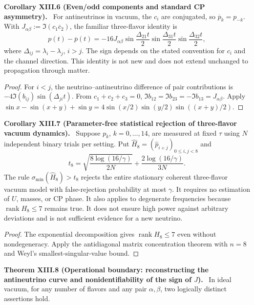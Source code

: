 \documentclass[11pt,a4paper,oneside]{book}
\DeclareMathOperator{\rank}{rank}\DeclareMathOperator{\Tr}{Tr}
\newcommand{\statement}[3]{\par\medskip\noindent\textbf{#1 #2 (#3).}\ }
\begin{document}
\statement{Corollary}{XIII.6}{Even/odd components and standard CP asymmetry} For antineutrinos in vacuum, the $c_i$ are conjugated, so $\overline p_k=p_{-k}$. With $J_{\alpha\beta}:=\Im(c_1\overline c_2)$, the familiar three-flavor identity is
\begin{equation}p(t)-\overline p(t)=-16J_{\alpha\beta}\sin\frac{\Delta_{21}t}{2}\sin\frac{\Delta_{31}t}{2}\sin\frac{\Delta_{32}t}{2},\tag{63}\end{equation}
where $\Delta_{ij}=\lambda_i-\lambda_j$, $i>j$. The sign depends on the stated convention for $c_i$ and the channel direction. This identity is not new and does not extend unchanged to propagation through matter.
\begin{proof}For $i<j$, the neutrino--antineutrino difference of pair contributions is $-4\Im(b_{ij})\sin(\Delta_{ji}t)$. From $c_1+c_2+c_3=0$, $\Im b_{12}=\Im b_{23}=-\Im b_{13}=J_{\alpha\beta}$. Apply $\sin x-\sin(x+y)+\sin y=4\sin(x/2)\sin(y/2)\sin((x+y)/2)$.\end{proof}
\statement{Corollary}{XIII.7}{Parameter-free statistical rejection of three-flavor vacuum dynamics} Suppose $p_k$, $k=0,\ldots,14$, are measured at fixed $\tau$ using $N$ independent binary trials per setting. Put $\widehat H_8=(\widehat p_{i+j})_{0\le i,j<8}$ and
\[t_8=\sqrt{\frac{8\log(16/\gamma)}{2N}}+\frac{2\log(16/\gamma)}{3N}.\]
The rule $\sigma_{\min}(\widehat H_8)>t_8$ rejects the entire stationary coherent three-flavor vacuum model with false-rejection probability at most $\gamma$. It requires no estimation of $U$, masses, or CP phase. It also applies to degenerate frequencies because $\rank H_8\le7$ remains true. It does not ensure high power against arbitrary deviations and is not sufficient evidence for a new neutrino.
\begin{proof}The exponential decomposition gives $\rank H_8\le7$ even without nondegeneracy. Apply the antidiagonal matrix concentration theorem with $n=8$ and Weyl's smallest-singular-value bound.\end{proof}
\statement{Theorem}{XIII.8}{Operational boundary: reconstructing the antineutrino curve and nonidentifiability of the sign of $J$} In ideal vacuum, for any number of flavors and any pair $\alpha,\beta$, two logically distinct assertions hold.
\end{document}
